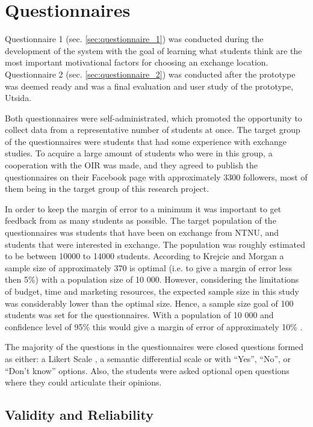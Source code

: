 \section{Questionnaires}

Questionnaire 1 (sec. \ref{sec:questionnaire_1}) was conducted during the development of the system with the goal of learning what students think are the most important motivational factors for choosing an exchange location. Questionnaire 2 (sec. \ref{sec:questionnaire_2}) was conducted after the prototype was deemed ready and was a final evaluation and user study of the prototype, Utsida.

Both questionnaires were self-administrated, which promoted the opportunity to collect data from a representative number of students at once. The target group of the questionnaires were students that had some experience with exchange studies. To acquire a large amount of students who were in this group, a cooperation with the OIR was made, and they agreed to publish the questionnaires on their Facebook page with approximately 3300 followers, most of them being in the target group of this research project.

In order to keep the margin of error to a minimum it was important to get feedback from as many students as possible. The target population of the questionnaires was students that have been on exchange from NTNU, and students that were interested in exchange. The population was roughly estimated to be between 10000 to 14000 students. According to Krejcie and Morgan \cite{krejcie1970determining} a sample size of approximately 370 is optimal (i.e. to give a margin of error less then 5\%) with a population size of 10 000. However, considering the limitations of budget, time and marketing resources, the expected sample size in this study was considerably lower than the optimal size. Hence, a sample size goal of 100 students was set for the questionnaires. With a population of 10 000 and confidence level of 95\% this would give a margin of error of approximately 10\% \cite{yamane1973statistics}. 

The majority of the questions in the questionnaires were closed questions formed as either: a Likert Scale \cite{allen2007likert}, a semantic differential scale \cite{osgood1952nature} or with \enquote{Yes}, \enquote{No}, or \enquote{Don't know} options. Also, the students were asked optional open questions where they could articulate their opinions. 

\subsection{Validity and Reliability}

